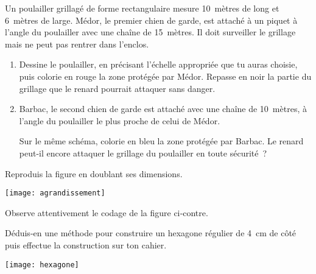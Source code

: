 \begin{exercice}
Un poulailler grillagé de forme rectangulaire mesure 10 mètres de long et 6 mètres de large. Médor, le premier chien de garde, est attaché à un piquet à l'angle du poulailler avec une chaîne de 15 mètres. Il doit surveiller le grillage mais ne peut pas rentrer dans l'enclos. 
\begin{enumerate}
 \item Dessine le poulailler, en précisant l'échelle appropriée que tu auras choisie, puis colorie en rouge la zone protégée par Médor. Repasse en noir la partie du grillage que le renard pourrait attaquer sans danger.
 \item Barbac, le second chien de garde est attaché avec une chaîne de 10 mètres, à l'angle du poulailler le plus proche de celui de Médor.
 
Sur le même schéma, colorie en bleu la zone protégée par Barbac. Le renard peut-il encore attaquer le grillage du poulailler en toute sécurité ?
 \end{enumerate}
\end{exercice}


\begin{exercice}[Agrandissement]
Reproduis la figure en doublant ses dimensions.
\begin{center} \texttt{[image: agrandissement]} \end{center}
\end{exercice}


\begin{exercice}

\vspace{1em}

\begin{minipage}[c]{0.50\linewidth}
Observe attentivement le codage de la figure ci‑contre. 

Déduis-en une méthode pour construire un hexagone régulier de 4 cm de côté puis effectue la construction sur ton cahier.
 \end{minipage} \hfill%
 \begin{minipage}[c]{0.46\linewidth}
  \begin{center} \texttt{[image: hexagone]} \end{center}
  \end{minipage} \\
\end{exercice}


